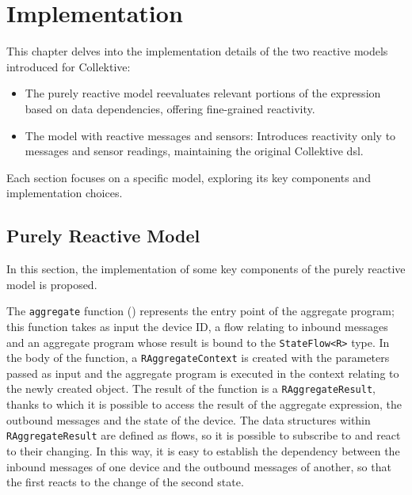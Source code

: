 
\chapter{Implementation}
\label{chap:implementation}

This chapter delves into the implementation details of the two reactive models introduced for Collektive:

\begin{itemize}
    \item The purely reactive model reevaluates relevant portions of the expression based on data dependencies, offering fine-grained reactivity.
    \item The model with reactive messages and sensors: Introduces reactivity only to messages and sensor readings, maintaining the original Collektive \ac{dsl}.
\end{itemize}

Each section focuses on a specific model, exploring its key components and implementation choices.

\section{Purely Reactive Model}
\label{section:prm}

In this section, the implementation of some key components of the purely reactive model is proposed.

The \texttt{aggregate} function () represents the entry point of the aggregate program; this function takes as input the device ID, a flow relating to inbound messages and an aggregate program whose result is bound to the \texttt{StateFlow<R>} type. In the body of the function, a \texttt{RAggregateContext} is created with the parameters passed as input and the aggregate program is executed in the context relating to the newly created object. The result of the function is a \texttt{RAggregateResult}, thanks to which it is possible to access the result of the aggregate expression, the outbound messages and the state of the device. The data structures within \texttt{RAggregateResult} are defined as flows, so it is possible to subscribe to and react to their changing. In this way, it is easy to establish the dependency between the inbound messages of one device and the outbound messages of another, so that the first reacts to the change of the second state.

